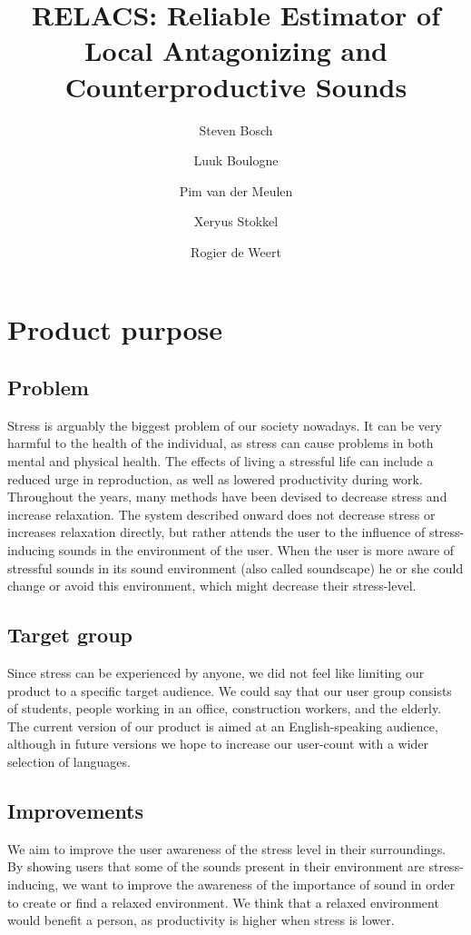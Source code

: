 \documentclass[a4paper]{article}
\title{{RELACS: Reliable Estimator of Local Antagonizing and Counterproductive Sounds}}
\author{Steven Bosch \and Luuk Boulogne \and Pim van der Meulen \and Xeryus Stokkel  \and Rogier de Weert}
\begin{document}
\maketitle

\section{Product purpose}

\subsection{Problem}
Stress is arguably the biggest problem of our society nowadays. It can be very harmful to the health of the individual, as stress can cause problems in both mental and physical health. The effects of living a stressful life can include a reduced urge in reproduction, as well as lowered productivity during work. Throughout the years, many methods have been devised to decrease stress and increase relaxation. The system described onward does not decrease stress or increases relaxation directly, but rather attends the user to the influence of stress-inducing sounds in the environment of the user. When the user is more aware of stressful sounds in its sound environment (also called soundscape) he or she could change or avoid this environment, which might decrease their stress-level.

\subsection{Target group}
Since stress can be experienced by anyone, we did not feel like limiting our product to a specific target audience. We could say that our user group consists of students, people working in an office, construction workers, and the elderly. 
The current version of our product is aimed at an English-speaking audience, although in future versions we hope to increase our user-count with a wider selection of languages. 

\subsection{Improvements}
We aim to improve the user awareness of the stress level in their surroundings.
By showing users that some of the sounds present in their environment are stress-inducing, we want to improve the awareness of the importance of sound in order to create or find a relaxed environment. 
We think that a relaxed environment would benefit a person, as productivity is higher when stress is lower.
\end{document}
